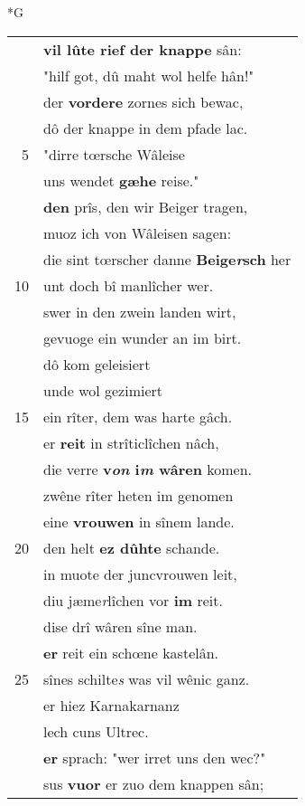 \documentclass[8pt,a4paper,notitlepage]{article}
\begin{document}
\begin{table}[ht]
\begin{minipage}[t]{0.5\linewidth}
\small
\begin{center}*G
\end{center}
\begin{tabular}{rl}
 & \textbf{vil lûte rief der knappe} sân:\\ 
 & "hilf got, dû maht wol helfe hân!"\\ 
 & der \textbf{vordere} zornes sich bewac,\\ 
 & dô der knappe in dem pfade lac.\\ 
5 & "dirre tœrsche Wâleise\\ 
 & uns wendet \textbf{gæhe} reise."\\ 
 & \textbf{den} prîs, den wir Beiger tragen,\\ 
 & muoz ich von Wâleisen sagen:\\ 
 & die sint tœrscher danne \textbf{Beige\textit{r}sch} her\\ 
10 & unt doch bî manlîcher wer.\\ 
 & swer in den zwein landen wirt,\\ 
 & gevuoge ein wunder an im birt.\\ 
 & dô kom geleisiert\\ 
 & unde wol gezimiert\\ 
15 & ein rîter, dem was harte gâch.\\ 
 & er \textbf{reit} in strîticlîchen nâch,\\ 
 & die verre \textbf{v\textit{on} i\textit{m} wâren} komen.\\ 
 & zwêne rîter heten im genomen\\ 
 & eine \textbf{vrouwen} in sînem lande.\\ 
20 & den helt \textbf{ez dûhte} schande.\\ 
 & in muote der juncvrouwen leit,\\ 
 & diu jæme\textit{r}lîchen vor \textbf{im} reit.\\ 
 & dise drî wâren sîne man.\\ 
 & \textbf{er} reit ein schœne kastelân.\\ 
25 & sînes schilte\textit{s} was vil wênic ganz.\\ 
 & er hiez Karnakarnanz\\ 
 & lech cuns Ultrec.\\ 
 & \textbf{er} sprach: "wer irret uns den wec?"\\ 
 & sus \textbf{vuor} er zuo dem knappen sân;\\ 

\end{tabular}
\end{minipage}
\end{table}
\end{document}
